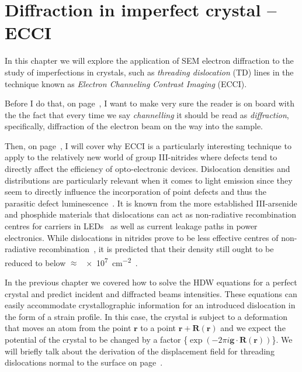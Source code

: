 \chapter{Diffraction in imperfect crystal -- ECCI}
\label{chap:ECCI}

In this chapter we will explore the application of SEM  electron diffraction to the study of imperfections in crystals, such as \textit{threading dislocation} (TD) lines in the technique known as \textit{Electron Channeling Contrast Imaging} (ECCI). 

Before I do that, on page~\pageref{sec:channelling}, I want to make very sure the reader is on board with the the fact that every time we say \emph{channelling} it should be read as \emph{diffraction}, specifically, diffraction of the electron beam on the way into the sample.

Then, on page~\pageref{sec:ECCITDmotivation},  I will cover why ECCI is a particularly interesting technique to apply to the relatively new world of group III-nitrides where defects tend to directly affect the efficiency of opto-electronic  devices. Dislocation densities and distributions are particularly relevant when it comes to light emission since they seem to directly influence the incorporation of point defects and thus the parasitic defect luminescence~\cite{Gunnar}. It is known from the more established III-arsenide and phosphide materials that dislocations can act as non-radiative recombination centres for carriers in LEDs~\cite{Peng05} as well as current leakage paths in power electronics. While dislocations in nitrides prove to be less effective centres of non-radiative recombination~\cite{Lester95}, it is predicted that their density still ought to be reduced to below $\approx$ \SI{e7}{\centi \meter^{-2}}~\cite{Karpov02}.


In the previous chapter we covered how to solve the HDW equations for a perfect crystal and predict incident and diffracted beams intensities.  These equations can easily accommodate crystallographic information for an introduced dislocation in the form of a strain profile. In this case, the  crystal is subject to a deformation that moves an atom from the point $\textbf{r}$ to a point $\textbf{r}+\textbf{R}(\textbf{r})$ and we expect  the potential of the crystal to be  changed by a factor \{$\exp(-2\pi i \textbf{g}\cdot \textbf{R}(\textbf{r}))$\}.  We will briefly talk about the derivation of the displacement field for threading dislocations normal to the surface on page~\pageref{sec:strain}.

